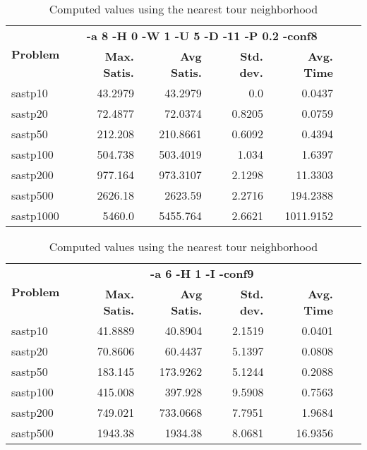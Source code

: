 \documentclass{article}
\begin{document}
\begin{table}[b!]
  \vspace{-6mm}%
  \caption{Computed values using the nearest tour neighborhood}
  \label{tab:NearestTour}
  \setlength{\tabcolsep}{1.4mm}
  \centering
  \begin{tabular}{lrrrrrr}
   \multirow{2}{*}{\bfseries Problem} &
      \multicolumn{4}{c}{\bfseries -a 8 -H 0 -W 1 -U 5 -D -11 -P 0.2 -conf8 } \\
    &
    \bfseries Max. Satis. &
    \bfseries Avg Satis. &
    \bfseries Std. dev. &
    \bfseries Avg. Time 
    \\\hline
  sastp10 & 43.2979 & 43.2979 & 0.0 & 0.0437 \\ 
sastp20 & 72.4877 & 72.0374 & 0.8205 & 0.0759 \\ 
sastp50 & 212.208 & 210.8661 & 0.6092 & 0.4394 \\ 
sastp100 & 504.738 & 503.4019 & 1.034 & 1.6397 \\ 
sastp200 & 977.164 & 973.3107 & 2.1298 & 11.3303 \\ 
sastp500 & 2626.18 & 2623.59 & 2.2716 & 194.2388 \\ 
sastp1000 & 5460.0 & 5455.764 & 2.6621 & 1011.9152
    \\\hline
  \end{tabular}

\end{table}

\begin{table}[b!]
  \vspace{-6mm}%
  \caption{Computed values using the nearest tour neighborhood}
  \label{tab:NearestTour}
  \setlength{\tabcolsep}{1.4mm}
  \centering
  \begin{tabular}{lrrrrrr}
   \multirow{2}{*}{\bfseries Problem} &
      \multicolumn{4}{c}{\bfseries -a 6 -H 1 -I -conf9 } \\
    &
    \bfseries Max. Satis. &
    \bfseries Avg Satis. &
    \bfseries Std. dev. &
    \bfseries Avg. Time 
    \\\hline
sastp10 & 41.8889 & 40.8904 & 2.1519 & 0.0401 \\ 
sastp20 & 70.8606 & 60.4437 & 5.1397 & 0.0808 \\ 
sastp50 & 183.145 & 173.9262 & 5.1244 & 0.2088 \\ 
sastp100 & 415.008 & 397.928 & 9.5908 & 0.7563 \\ 
sastp200 & 749.021 & 733.0668 & 7.7951 & 1.9684 \\ 
sastp500 & 1943.38 & 1934.38 & 8.0681 & 16.9356
    \\\hline
  \end{tabular}

\end{table}
\end{document}
